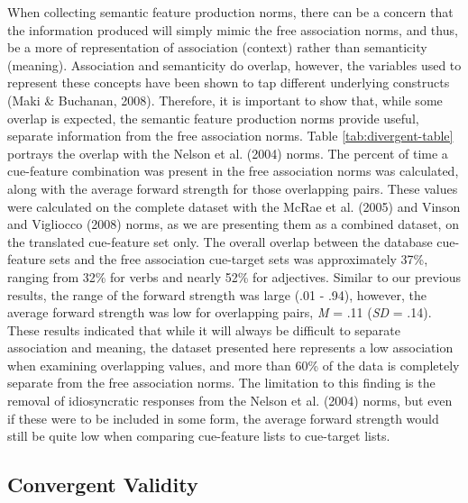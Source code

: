 \documentclass[english,,man]{apa6}
\theoremstyle{definition}
\theoremstyle{definition}
\theoremstyle{definition}
\theoremstyle{remark}
\begin{document}
When collecting semantic feature production norms, there can be a
concern that the information produced will simply mimic the free
association norms, and thus, be a more of representation of association
(context) rather than semanticity (meaning). Association and semanticity
do overlap, however, the variables used to represent these concepts have
been shown to tap different underlying constructs (Maki \& Buchanan,
2008). Therefore, it is important to show that, while some overlap is
expected, the semantic feature production norms provide useful, separate
information from the free association norms. Table
\ref{tab:divergent-table} portrays the overlap with the Nelson et al.
(2004) norms. The percent of time a cue-feature combination was present
in the free association norms was calculated, along with the average
forward strength for those overlapping pairs. These values were
calculated on the complete dataset with the McRae et al. (2005) and
Vinson and Vigliocco (2008) norms, as we are presenting them as a
combined dataset, on the translated cue-feature set only. The overall
overlap between the database cue-feature sets and the free association
cue-target sets was approximately 37\%, ranging from 32\% for verbs and
nearly 52\% for adjectives. Similar to our previous results, the range
of the forward strength was large (.01 - .94), however, the average
forward strength was low for overlapping pairs, \emph{M} = .11
(\emph{SD} = .14). These results indicated that while it will always be
difficult to separate association and meaning, the dataset presented
here represents a low association when examining overlapping values, and
more than 60\% of the data is completely separate from the free
association norms. The limitation to this finding is the removal of
idiosyncratic responses from the Nelson et al. (2004) norms, but even if
these were to be included in some form, the average forward strength
would still be quite low when comparing cue-feature lists to cue-target
lists.

\hypertarget{convergent-validity}{%
\subsection{Convergent Validity}\label{convergent-validity}}
\end{document}
